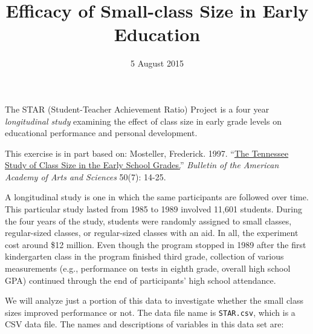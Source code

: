 \documentclass[]{article}
\title{Efficacy of Small-class Size in Early Education}
\author{}
\date{5 August 2015}
\begin{document}
\maketitle


The STAR (Student-Teacher Achievement Ratio) Project is a four year
\emph{longitudinal study} examining the effect of class size in early
grade levels on educational performance and personal development.

This exercise is in part based on: Mosteller, Frederick. 1997.
``\href{http://dx.doi.org/10.2307/3824562}{The Tennessee Study of Class
Size in the Early School Grades.}'' \emph{Bulletin of the American
Academy of Arts and Sciences} 50(7): 14-25.

A longitudinal study is one in which the same participants are followed
over time. This particular study lasted from 1985 to 1989 involved
11,601 students. During the four years of the study, students were
randomly assigned to small classes, regular-sized classes, or
regular-sized classes with an aid. In all, the experiment cost around
\$12 million. Even though the program stopped in 1989 after the first
kindergarten class in the program finished third grade, collection of
various measurements (e.g., performance on tests in eighth grade,
overall high school GPA) continued through the end of participants' high
school attendance.

We will analyze just a portion of this data to investigate whether the
small class sizes improved performance or not. The data file name is
\texttt{STAR.csv}, which is a CSV data file. The names and descriptions
of variables in this data set are:
\end{document}
